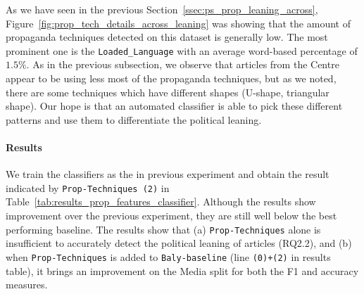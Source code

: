 As we have seen in the previous Section~\ref{ssec:ps_prop_leaning_across},  Figure~\ref{fig:prop_tech_details_across_leaning} was showing that the amount of propaganda techniques detected on this dataset is generally low. The most prominent one is the \texttt{Loaded\_Language} with an average word-based percentage of $1.5\%$.
As in the previous subsection, we observe that articles from the Centre appear to be using less most of the propaganda techniques, %
but as we noted, there are some techniques which have different shapes (U-shape, triangular shape). Our hope is that an automated classifier is able to pick these different patterns and use them to differentiate the political leaning. 




\paragraph{Results}

We train the classifiers as the in previous experiment and obtain the result indicated by \texttt{Prop-Techniques (2)} in Table~\ref{tab:results_prop_features_classifier}. Although the results show improvement over the previous experiment, they are still well below the best performing baseline. %
The results show that (a) \texttt{Prop-Techniques} alone is insufficient to accurately detect the political leaning of articles (RQ2.2), and (b) when \texttt{Prop-Techniques} is added to \texttt{Baly-baseline} (line \texttt{(0)+(2)} in results table), it brings an improvement on the Media split for both the F1 and accuracy measures. 


